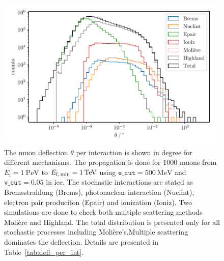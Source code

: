 \documentclass[pdflatex, sn-mathphys]{sn-jnl}%
\theoremstyle{thmstyleone}%
\theoremstyle{thmstyletwo}%
\theoremstyle{thmstylethree}%
\begin{document}
\begin{figure}
    \centering 
    \includegraphics[width=0.98\textwidth]{../../deflection/plots/FINAL/1PeV_1TeV_1000events_deflection_along_sampling.pdf}
    \caption{The muon deflection $\theta$ per interaction is shown in degree for different mechanisms. The propagation is done for $\num{1000}$ 
    muons from $E_{\text{i}} = \SI{1}{\peta\electronvolt}$ to $E_{\text{f,\,min}} = \SI{1}{\tera\electronvolt}$ using $\texttt{e\_cut} = \SI{500}{\mega\electronvolt}$ and $\texttt{v\_cut} = 0.05$ in ice. 
    The stochastic interactions 
    are stated as Bremsstrahlung (Brems), photonuclear interaction (Nuclint), electron pair produciton (Epair) and ionization (Ioniz).
    Two simulations 
    are done to check both multiple scattering methods Molière and Highland.  
    The total distribution is presented only for all stochastic processes including Molière's.Multiple scattering dominates the deflection. Details are presented in 
    Table~\ref{tab:defl_per_int}.}
    \label{fig:defl_per_int}
\end{figure}
\end{document}
